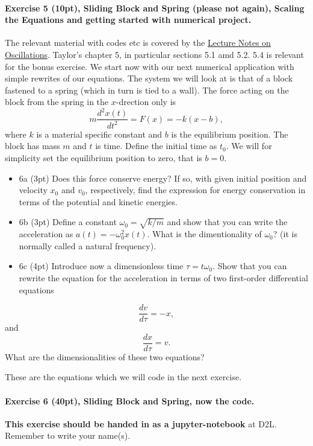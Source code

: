 \documentclass[%
oneside,                 %
final,                   %
10pt]{article}
\begin{document}
\paragraph{Exercise 5 (10pt), Sliding Block  and Spring (please not again), Scaling the Equations and getting started with numerical project.}
The relevant material with codes etc is covered by the \href{{https://mhjensen.github.io/Physics321/doc/pub/harmonic/html/harmonic.html}}{Lecture Notes on Oscillations}. Taylor's chapter 5, in particular sections 5.1 amd 5.2. 5.4 is relevant for the bonus exercise.
We start now with our next numerical application with simple rewrites of our equations. The system we will look at is that of a block fastened to a spring (which in turn is tied to a wall).
The force acting on the block from the spring in the $x$-drection only is
\[
m\frac{d^2x(t)}{dt^2}=F(x) = -k(x-b),
\]
where $k$ is a material specific constant and $b$ is the equilibrium position. The block has mass $m$ and $t$ is time. Define the initial time as $t_0$. We will for simplicity set the equilibrium position to zero, that is $b=0$.

\begin{itemize}
\item 6a (3pt) Does this force conserve energy? If so, with given initial position and velocity $x_0$ and $v_0$, respectively, find the expression for energy conservation in terms of the potential and kinetic energies.  

\item 6b (3pt) Define a constant $\omega_0=\sqrt{k/m}$ and show that you can write the acceleration as $a(t) = -\omega_0^2 x(t)$. What is the dimentionality of $\omega_0$? (it is normally called a natural frequency).  

\item 6c (4pt) Introduce now a dimensionless time $\tau = t\omega_0$. Show that you can rewrite the  equation for the acceleration in terms of two first-order differential equations
\end{itemize}

\noindent
\[
\frac{dv}{d\tau} = -x,
\]
and
\[
\frac{dx}{d\tau} = v.
\]
What are the dimensionalities of these two equations?

These are the equations which we will code in the next exercise.

\paragraph{Exercise 6 (40pt), Sliding Block  and Spring, now the code.}
\textbf{This exercise should be handed in as a jupyter-notebook} at D2L. Remember to write your name(s). 
\end{document}
